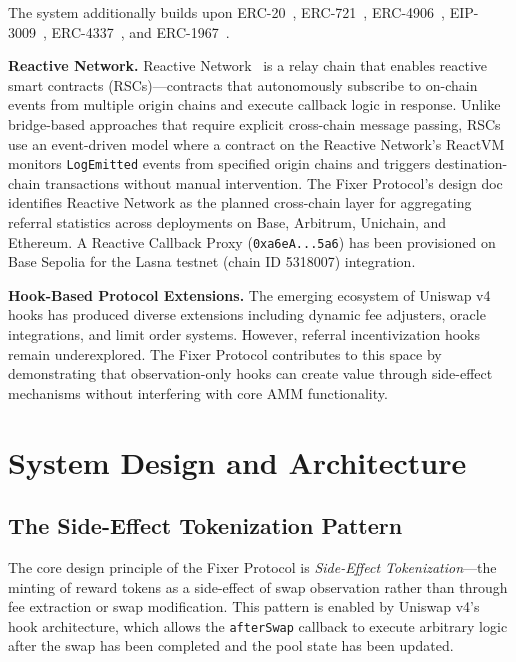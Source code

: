 \documentclass[conference]{IEEEtran}
\begin{document}
The system additionally builds upon ERC-20~\cite{erc20}, ERC-721~\cite{erc721}, ERC-4906~\cite{erc4906}, EIP-3009~\cite{eip3009}, ERC-4337~\cite{erc4337}, and ERC-1967~\cite{erc1967}.

\textbf{Reactive Network.} Reactive Network~\cite{reactivenetwork} is a relay chain that enables reactive smart contracts (RSCs)---contracts that autonomously subscribe to on-chain events from multiple origin chains and execute callback logic in response. Unlike bridge-based approaches that require explicit cross-chain message passing, RSCs use an event-driven model where a contract on the Reactive Network's ReactVM monitors \texttt{LogEmitted} events from specified origin chains and triggers destination-chain transactions without manual intervention. The Fixer Protocol's design doc identifies Reactive Network as the planned cross-chain layer for aggregating referral statistics across deployments on Base, Arbitrum, Unichain, and Ethereum. A Reactive Callback Proxy (\texttt{0xa6eA...5a6}) has been provisioned on Base Sepolia for the Lasna testnet (chain ID 5318007) integration.

\textbf{Hook-Based Protocol Extensions.} The emerging ecosystem of Uniswap v4 hooks has produced diverse extensions including dynamic fee adjusters, oracle integrations, and limit order systems. However, referral incentivization hooks remain underexplored. The Fixer Protocol contributes to this space by demonstrating that observation-only hooks can create value through side-effect mechanisms without interfering with core AMM functionality.

\section{System Design and Architecture}
\label{sec:design}

\subsection{The Side-Effect Tokenization Pattern}

The core design principle of the Fixer Protocol is \textit{Side-Effect Tokenization}---the minting of reward tokens as a side-effect of swap observation rather than through fee extraction or swap modification. This pattern is enabled by Uniswap v4's hook architecture, which allows the \texttt{afterSwap} callback to execute arbitrary logic after the swap has been completed and the pool state has been updated.
\end{document}
